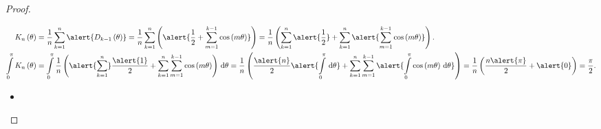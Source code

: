 \begin{frame}[allowframebreaks]
\begin{proof}
\begin{itemize}
			      \begin{align*}
				      K_{n}\left(\theta\right) & =
				      \frac{1}{n}
				      \sum_{k=1}^{n}
				      \alert{D_{k-1}\left(\theta\right)}=
				      \frac{1}{n}
				      \sum_{k=1}^{n}
				      \left(
				      \alert{
					      \frac{1}{2}+
					      \sum_{m=1}^{k-1}
					      \cos\left(m\theta\right)
				      }
				      \right)=
				      \frac{1}{n}
				      \left(
				      \sum_{k=1}^{n}
				      \alert{\frac{1}{2}}+
				      \sum_{k=1}^{n}
				      \alert{
					      \sum_{m=1}^{k-1}
					      \cos\left(m\theta\right)
				      }
				      \right).                     \\
				      \int\limits_{0}^{\pi}
				      K_{n}\left(\theta\right)
				                               & =
				      \int\limits_{0}^{\pi}
				      \frac{1}{n}
				      \left(
				      \alert{\sum_{k=1}^{n}}
				      \frac{\alert{1}}{2}+
				      \sum_{k=1}^{n}
				      \sum_{m=1}^{k-1}
				      \cos\left(m\theta\right)
				      \right)
				      \dl\theta
				      =
				      \frac{1}{n}
				      \left(
				      \frac{\alert{n}}{2}
				      \alert{
					      \int\limits_{0}^{\pi}
					      \dl\theta
				      }
				      +
				      \sum_{k=1}^{n}
				      \sum_{m=1}^{k-1}
				      \alert{
					      \int\limits_{0}^{\pi}
					      \cos\left(m\theta\right)
					      \dl\theta
				      }
				      \right)
				      =
				      \frac{1}{n}
				      \left(
				      \frac{n\alert{\pi}}{2}+\alert{0}
				      \right)=
				      \frac{\pi}{2}.
			      \end{align*}
		\end{itemize}

		\framebreak

		\begin{itemize}
			\item


\end{itemize}
\end{proof}
\end{frame}
